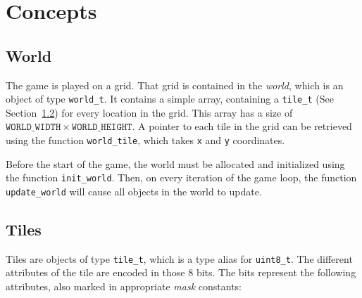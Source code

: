 \section{Concepts}
\label{sec:concepts}

\subsection{World}
\label{sec:world}

The game is played on a grid. That grid is contained in the \emph{world}, which
is an object of type \texttt{world\_t}. It contains a simple array, containing
a \texttt{tile\_t} (See Section~\ref{sec:tiles}) for every location in the
grid. This array has a size of $\mathtt{WORLD\_WIDTH \times WORLD\_HEIGHT}$. A
pointer to each tile in the grid can be retrieved using the function
\texttt{world\_tile}, which takes \texttt{x} and \texttt{y} coordinates.

Before the start of the game, the world must be allocated and initialized using
the function \texttt{init\_world}. Then, on every iteration of the game loop,
the function \texttt{update\_world} will cause all objects in the world to
update.

\subsection{Tiles}
\label{sec:tiles}

Tiles are objects of type \texttt{tile\_t}, which is a type alias for
\texttt{uint8\_t}. The different attributes of the tile are encoded in those 8
bits. The bits represent the following attributes, also marked in appropriate
\emph{mask} constants:

